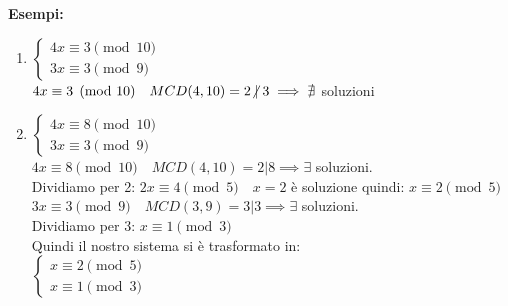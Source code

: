 \documentclass[12pt, letterpaper]{report}
\begin{document}
		\textbf{Esempi:}
		\begin{enumerate}
			\item $\begin{cases}
				4x \equiv 3 \pmod{10} \\
				3x \equiv 3 \pmod{9}
			\end{cases}$ \\
			$4x \equiv 3 \pmod{10} \quad MCD(4,10)=2 \centernot{|} 3 \implies \nexists$ soluzioni
			\item $\begin{cases}
				4x \equiv 8 \pmod{10} \\
				3x \equiv 3 \pmod{9}
			\end{cases}$ \\
			$4x \equiv 8 \pmod{10} \quad MCD(4, 10) = 2 | 8 \implies \exists$ soluzioni. \\
			Dividiamo per 2: $2x \equiv 4 \pmod{5} \quad x=2$ è soluzione quindi: $x \equiv 2 \pmod{5} $ \\
			$3x \equiv 3 \pmod{9} \quad MCD(3,9) = 3 | 3 \implies \exists$ soluzioni. \\
			Dividiamo per 3: $x \equiv 1 \pmod{3}$ \\
			Quindi il nostro sistema si è trasformato in: \\
			$\begin{cases}
				x \equiv 2 \pmod{5} \\
				x \equiv 1 \pmod{3}
			\end{cases}$
		\end{enumerate}
\end{document}
